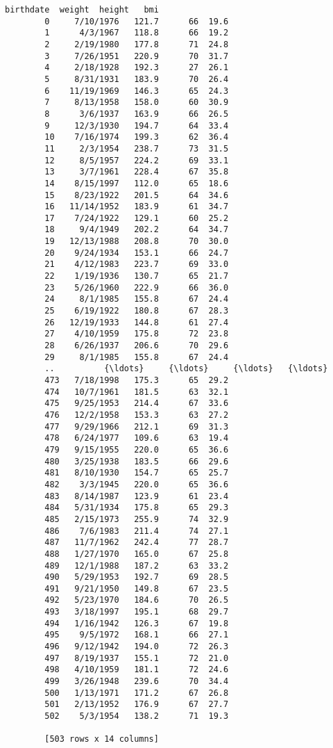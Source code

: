 \documentclass[11pt]{article}
\begin{document}
\begin{Verbatim}[commandchars=\\\{\}]
              birthdate  weight  height   bmi  
        0     7/10/1976   121.7      66  19.6  
        1      4/3/1967   118.8      66  19.2  
        2     2/19/1980   177.8      71  24.8  
        3     7/26/1951   220.9      70  31.7  
        4     2/18/1928   192.3      27  26.1  
        5     8/31/1931   183.9      70  26.4  
        6    11/19/1969   146.3      65  24.3  
        7     8/13/1958   158.0      60  30.9  
        8      3/6/1937   163.9      66  26.5  
        9     12/3/1930   194.7      64  33.4  
        10    7/16/1974   199.3      62  36.4  
        11     2/3/1954   238.7      73  31.5  
        12     8/5/1957   224.2      69  33.1  
        13     3/7/1961   228.4      67  35.8  
        14    8/15/1997   112.0      65  18.6  
        15    8/23/1922   201.5      64  34.6  
        16   11/14/1952   183.9      61  34.7  
        17    7/24/1922   129.1      60  25.2  
        18     9/4/1949   202.2      64  34.7  
        19   12/13/1988   208.8      70  30.0  
        20    9/24/1934   153.1      66  24.7  
        21    4/12/1983   223.7      69  33.0  
        22    1/19/1936   130.7      65  21.7  
        23    5/26/1960   222.9      66  36.0  
        24     8/1/1985   155.8      67  24.4  
        25    6/19/1922   180.8      67  28.3  
        26   12/19/1933   144.8      61  27.4  
        27    4/10/1959   175.8      72  23.8  
        28    6/26/1937   206.6      70  29.6  
        29     8/1/1985   155.8      67  24.4  
        ..          {\ldots}     {\ldots}     {\ldots}   {\ldots}  
        473   7/18/1998   175.3      65  29.2  
        474   10/7/1961   181.5      63  32.1  
        475   9/25/1953   214.4      67  33.6  
        476   12/2/1958   153.3      63  27.2  
        477   9/29/1966   212.1      69  31.3  
        478   6/24/1977   109.6      63  19.4  
        479   9/15/1955   220.0      65  36.6  
        480   3/25/1938   183.5      66  29.6  
        481   8/10/1930   154.7      65  25.7  
        482    3/3/1945   220.0      65  36.6  
        483   8/14/1987   123.9      61  23.4  
        484   5/31/1934   175.8      65  29.3  
        485   2/15/1973   255.9      74  32.9  
        486    7/6/1983   211.4      74  27.1  
        487   11/7/1962   242.4      77  28.7  
        488   1/27/1970   165.0      67  25.8  
        489   12/1/1988   187.2      63  33.2  
        490   5/29/1953   192.7      69  28.5  
        491   9/21/1950   149.8      67  23.5  
        492   5/23/1970   184.6      70  26.5  
        493   3/18/1997   195.1      68  29.7  
        494   1/16/1942   126.3      67  19.8  
        495    9/5/1972   168.1      66  27.1  
        496   9/12/1942   194.0      72  26.3  
        497   8/19/1937   155.1      72  21.0  
        498   4/10/1959   181.1      72  24.6  
        499   3/26/1948   239.6      70  34.4  
        500   1/13/1971   171.2      67  26.8  
        501   2/13/1952   176.9      67  27.7  
        502    5/3/1954   138.2      71  19.3  
        
        [503 rows x 14 columns]
\end{Verbatim}
            
\end{document}
